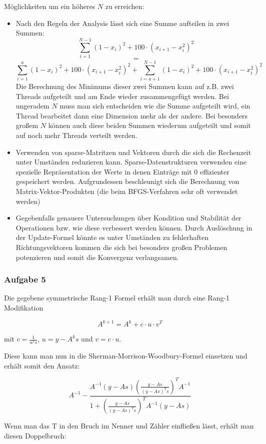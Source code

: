 \documentclass[a4paper, 12pt]{report}
\begin{document}
Möglichkeiten um ein höheres $N$ zu erreichen:
\begin{itemize}
  \item Nach den Regeln der Analysis lässt sich eine Summe aufteilen in zwei Summen:
  $$\sum_{i=1}^{N-1}(1 - x_i)^2 + 100\cdot(x_{i+1}-x_i^2)^2$$
  $$=$$
  $$\sum_{i=1}^{a}(1 - x_i)^2 + 100\cdot(x_{i+1}-x_i^2)^2 + \sum_{i=a+1}^{N-1}(1 - x_i)^2 + 100\cdot(x_{i+1}-x_i^2)^2$$
  Die Berechnung des Minimums dieser zwei Summen kann auf z.B. zwei Threads aufgeteilt und am Ende wieder zusammengefügt werden.
  Bei ungeradem $N$ muss man sich entscheiden wie die Summe aufgeteilt wird, ein Thread bearbeitet dann eine Dimension mehr als der andere.
  Bei besonders großem $N$ können auch diese beiden Summen wiederum aufgeteilt und somit auf noch mehr Threads verteilt werden.
  \item Verwenden von sparse-Matritzen und Vektoren durch die sich die Rechenzeit unter Umständen reduzieren kann. Sparse-Datenstrukturen
  verwenden eine spezielle Repräsentation der Werte in denen Einträge mit $0$ effizienter gespeichert werden. Aufgrundessen beschleunigt
  sich die Berechnung von Matrix-Vektor-Produkten (die beim BFGS-Verfahren sehr oft verwendet werden)
  \item Gegebenfalls genauere Untersuchungen über Kondition und Stabilität der Operationen bzw. wie diese verbessert werden können.
  Durch Auslöschung in der Update-Formel könnte es unter Umständen zu fehlerhaften Richtungsvektoren kommen die sich bei besonders
  großen Problemen potenzieren und somit die Konvergenz verlangsamen.
\end{itemize}

\subsubsection{Aufgabe 5}

Die gegebene symmetrische Rang-1 Formel erhält man durch eine Rang-1 Modifikation

$$A^{k + 1} = A^k + c\cdot u\cdot v^T$$

mit $c = \frac{1}{u^Ts}$, $u = y - A^ks$ und $v = c\cdot u$.

Diese kann man nun in die Sherman-Morrison-Woodbury-Formel einsetzen und erhält somit den Ansatz:

$$ A^{-1} - \frac{ A^{-1}(y-As)\left(\frac{ y-As }{ (y-As)^Ts } \right)^TA^{-1} }{1 + \left(\frac{ y-As }{ (y-As)^Ts }\right)^TA^{-1}(y-As)}$$

Wenn man das T in den Bruch im Nenner und Zähler einfließen lässt, erhält man diesen Doppelbruch:
\end{document}
